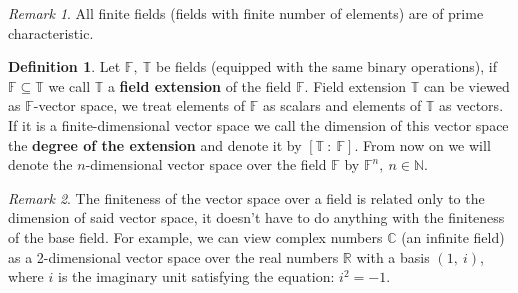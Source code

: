 \documentclass[thesis=M,english]{FITthesis}[2012/10/20]
\theoremstyle{remark}
\newtheorem*{RM}{Remark}
\theoremstyle{definition}
\newtheorem{DF}{Definition}[section]
\begin{document}
\begin{RM}
All finite fields (fields with finite number of elements) are of prime characteristic. 
\end{RM}

\begin{DF}
Let $\mathbb{F},\ \mathbb{T}$ be fields (equipped with the same binary operations), if $\mathbb{F} \subseteq \mathbb{T}$ we call $\mathbb{T}$ a \textbf{field extension} of the field $\mathbb{F}$. Field extension $\mathbb{T}$ can be viewed as $\mathbb{F}$-vector space, we treat elements of $\mathbb{F}$ as scalars and elements of $\mathbb{T}$ as vectors. If it is a finite-dimensional vector space we call the dimension of this vector space the \textbf{degree of the extension} and denote it by $[\mathbb{T}\ :\ \mathbb{F}]$. From now on we will denote the $n$-dimensional vector space over the field $\mathbb{F}$ by $\mathbb{F}^n,\ n \in \mathbb{N}$.
\end{DF}
\begin{RM}
The finiteness of the vector space over a field is related only to the dimension of said vector space, it doesn't have to do anything with the finiteness of the base field. For example, we can view complex numbers $\mathbb{C}$ (an infinite field) as a 2-dimensional vector space over the real numbers $\mathbb{R}$ with a basis $(1,\ \mathit{i})$, where $\mathit{i}$ is the imaginary unit satisfying the equation: $\mathit{i}^2 = -1.$
\end{RM}
\end{document}
